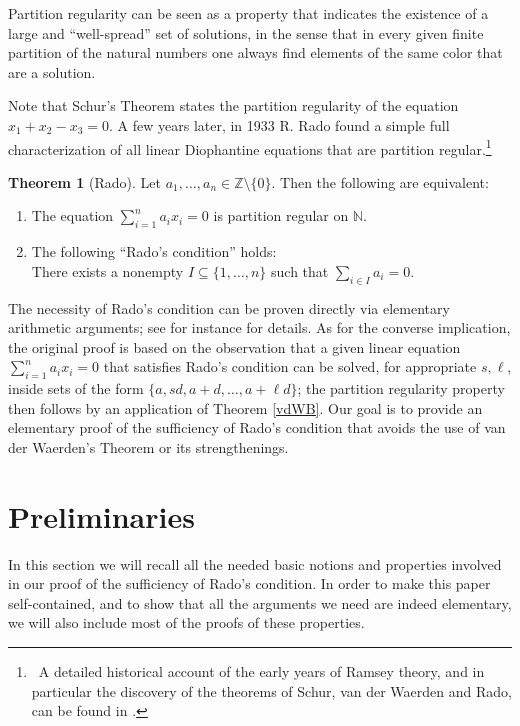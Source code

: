 \documentclass[a4paper,oneside]{article}
\newcommand{\N}{\mathbb{N}}
\newcommand{\Z}{\mathbb{Z}}
\theoremstyle{definition}
\newtheorem{theorem}{Theorem}[section]
\theoremstyle{named}
\begin{document}
Partition regularity can be seen as a property that 
indicates the existence of a large and ``well-spread''
set of solutions, in the sense that in every given finite partition of the natural numbers
one always find elements of the same color that are a solution.

\smallskip
Note that Schur's Theorem states the partition regularity of the equation $x_1+x_2-x_3=0$.
A few years later, in 1933 R. Rado \cite{ra}  found a simple full characterization of 
all linear Diophantine equations that are partition regular.\footnote
{~A detailed historical account of the early years of Ramsey theory,
and in particular the discovery of the theorems of Schur, van der Waerden and Rado, can be found in \cite{so}.}

\begin{theorem}[Rado]
Let $a_1,\ldots,a_n\in\Z\setminus\{0\}$. Then the following are equivalent:
\begin{enumerate}
\item 
The equation $\sum_{i=1}^{n}a_{i}x_{i}=0$ is partition regular on $\N$.
\item
The following ``Rado's condition'' holds:
\\
There exists a nonempty $I\subseteq\{1,\dots,n\}$ such that $\sum_{i\in I} a_i=0$.
\end{enumerate}
\end{theorem}

The necessity of Rado's condition can be proven directly via elementary 
arithmetic arguments; see for instance \cite[\S 3.2]{grs} for details. 
As for the converse implication,
the original proof is based on the observation that a given linear equation $\sum_{i=1}^{n}a_{i}x_{i}=0$ that satisfies Rado's condition can be solved, for appropriate $s,\ell$, inside sets of the form $\{a,sd,a+d,\dots,a+\ell d\}$; the partition regularity property then
follows by an application of Theorem \ref{vdWB}. Our goal is to provide an elementary proof of the sufficiency of Rado's condition that avoids the use of van der Waerden's Theorem or its strengthenings. 



\section{Preliminaries}\label{prelim}

In this section we will recall all the needed basic notions and properties
involved in our proof of the sufficiency of Rado's condition.
In order to make this paper self-contained, and to show that all the arguments we need 
are indeed elementary, we will also include most of the proofs of these properties. 
\end{document}
